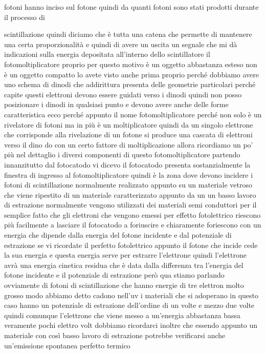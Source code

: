fotoni hanno inciso sul fotone quindi da quanti fotoni sono stati prodotti durante il processo di 

scintillazione quindi diciamo che è tutta una catena che permette di mantenere una certa proporzionalità e quindi di avere un uscita un segnale che mi dà indicazioni sulla energia depositata all'interno dello scintillatore il fotomoltiplicatore proprio per questo motivo è un oggetto abbastanza esteso non è un oggetto compatto lo avete visto anche prima proprio perché dobbiamo avere uno schema di dinodi che addirittura presenta delle geometrie particolari perché capite questi elettroni devono essere guidati verso i dinodi quindi non posso posizionare i dinodi in qualsiasi punto e devono avere anche delle forme caratteristica ecco perché appunto il nome fotomoltiplicatore perché non solo è un rivelatore di fotoni ma in più è un moltiplicatore quindi da un singolo elettrone che corrisponde alla rivelazione di un fotone si produce una cascata di elettroni verso il dino do con un certo fattore di moltiplicazione allora ricordiamo un po' più nel dettaglio i diversi componenti di questo fotomoltiplicatore partendo innanzitutto dal fotocatodo vi dicevo il fotocatodo presenta sostanzialmente la finestra di ingresso al fotomoltiplicatore quindi è la zona dove devono incidere i fotoni di scintillazione normalmente realizzato appunto su un materiale vetroso che viene ripestito di un materiale caratterizzato appunto da un un basso lavoro di estrazione normalmente vengono utilizzati dei materiali semi conduttori per il semplice fatto che gli elettroni che vengono emessi per effetto fotolettrico riescono più facilmente a lasciare il fotocatodo a foriuscire e chiaramente foriescono con un energia che dipende dalla energia del fotone incidente e dal potenziale di estrazione se vi ricordate il perfetto fotolettrico appunto il fotone che incide cede la sua energia e questa energia serve per estrarre l'elettrone quindi l'elettrone avrà una energia cinetica residua che è data dalla differenza tra l'energia del fotone incidente e il potenziale di estrazione però qua stiamo parlando ovviamente di fotoni di scintillazione che hanno energie di tre elettron molto grosso modo abbiamo detto cadono nell'uv i materiali che si adoperano in questo caso hanno un potenziale di estrazione dell'ordine di un volte e mezzo due volte quindi comunque l'elettrone che viene messo a un'energia abbastanza bassa veramente pochi elettro volt dobbiamo ricordarci inoltre che essendo appunto un materiale con così basso lavoro di estrazione potrebbe verificarsi anche un'emissione spontanea perfetto termico

